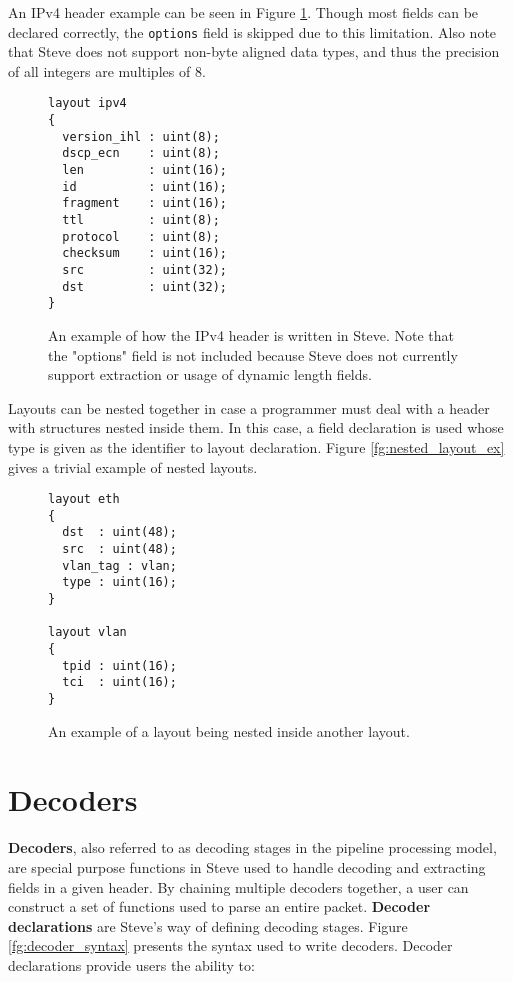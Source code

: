 An IPv4 header example can be seen in Figure \ref{fg:ipv4_layout_ex}. Though most fields can be declared correctly, the \texttt{options} field is skipped due to this limitation. Also note that Steve does not support non-byte aligned data types, and thus the precision of all integers are multiples of 8.

\begin{figure}
\begin{lstlisting}
layout ipv4
{
  version_ihl : uint(8);
  dscp_ecn    : uint(8);
  len         : uint(16);
  id          : uint(16);
  fragment    : uint(16);
  ttl         : uint(8);
  protocol    : uint(8);
  checksum    : uint(16);
  src         : uint(32);
  dst         : uint(32);
}
\end{lstlisting}
\caption{An example of how the IPv4 header is written in Steve. Note that the "options" field is not included because Steve does not currently support extraction or usage of dynamic length fields.}
\label{fg:ipv4_layout_ex}
\end{figure}

Layouts can be nested together in case a programmer must deal with a header with structures nested inside them. In this case, a field declaration is used whose type is given as the identifier to layout declaration. Figure \ref{fg:nested_layout_ex} gives a trivial example of nested layouts.


\begin{figure}
\begin{lstlisting}
layout eth
{
  dst  : uint(48);
  src  : uint(48);
  vlan_tag : vlan;
  type : uint(16);
}

layout vlan
{
  tpid : uint(16);
  tci  : uint(16);
}
\end{lstlisting}
\caption{An example of a layout being nested inside another layout.}
\label{fg:ethernet_layout_ex}
\end{figure}


\section{Decoders} \label{decoder_tut}

\textbf{Decoders}, also referred to as decoding stages in the pipeline processing model,  are special purpose functions in Steve used to handle decoding and extracting fields in a given header. By chaining multiple decoders together, a user can construct a set of functions used to parse an entire packet. \textbf{Decoder declarations} are Steve's way of defining decoding stages. Figure \ref{fg:decoder_syntax} presents the syntax used to write decoders. Decoder declarations provide users the ability to:

